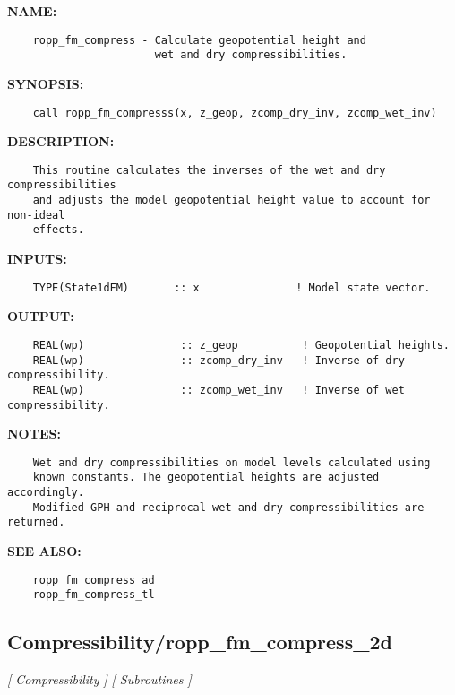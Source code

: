 \label{ch:robo17}
\label{ch:Compressibility_ropp_fm_compress}
\textbf{NAME:}\hspace{0.08in}\begin{Verbatim}
    ropp_fm_compress - Calculate geopotential height and 
                       wet and dry compressibilities.
\end{Verbatim}
\textbf{SYNOPSIS:}\hspace{0.08in}\begin{Verbatim}
    call ropp_fm_compresss(x, z_geop, zcomp_dry_inv, zcomp_wet_inv)
\end{Verbatim}
\textbf{DESCRIPTION:}\hspace{0.08in}\begin{Verbatim}
    This routine calculates the inverses of the wet and dry compressibilities
    and adjusts the model geopotential height value to account for non-ideal
    effects.
\end{Verbatim}
\textbf{INPUTS:}\hspace{0.08in}\begin{Verbatim}
    TYPE(State1dFM)       :: x               ! Model state vector.
\end{Verbatim}
\textbf{OUTPUT:}\hspace{0.08in}\begin{Verbatim}
    REAL(wp)               :: z_geop          ! Geopotential heights.
    REAL(wp)               :: zcomp_dry_inv   ! Inverse of dry compressibility.
    REAL(wp)               :: zcomp_wet_inv   ! Inverse of wet compressibility.
\end{Verbatim}
\textbf{NOTES:}\hspace{0.08in}\begin{Verbatim}
    Wet and dry compressibilities on model levels calculated using 
    known constants. The geopotential heights are adjusted accordingly. 
    Modified GPH and reciprocal wet and dry compressibilities are returned. 
\end{Verbatim}
\textbf{SEE ALSO:}\hspace{0.08in}\begin{Verbatim}
    ropp_fm_compress_ad
    ropp_fm_compress_tl
\end{Verbatim}
\subsection{Compressibility/ropp\_fm\_compress\_2d}
\textsl{[ Compressibility ]}
\textsl{[ Subroutines ]}

